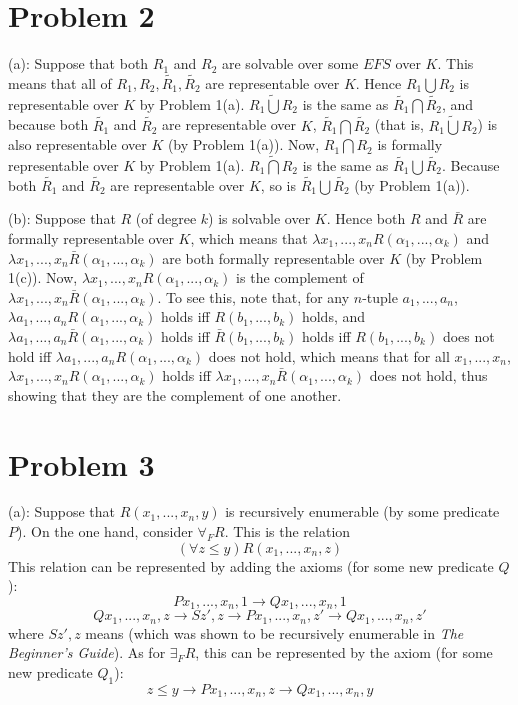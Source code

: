 \documentclass{article}
\theoremstyle{definition}
\begin{document}
\section*{Problem 2}
(a): Suppose that both $R_1$ and $R_2$ are solvable over some $EFS$ over $K$. This means that all of $R_1,R_2,\widetilde{R_1},\widetilde{R_2}$ are 
representable over $K$. Hence $R_1\bigcup R_2$ is representable over $K$ by Problem 1(a). 
$\widetilde{R_1\bigcup R_2}$ is the same as $\widetilde{R_1}\bigcap\widetilde{R_2}$, and because both $\widetilde{R_1}$ and $\widetilde{R_2}$ are 
representable over $K$, $\widetilde{R_1}\bigcap\widetilde{R_2}$ (that is, $\widetilde{{R_1}\bigcup{R_2}}$) is also representable over $K$ (by Problem 1(a)). 
Now, $R_1\bigcap R_2$ is formally representable over $K$ by Problem 1(a). $\widetilde{R_1\bigcap R_2}$ is the same as 
$\widetilde{R_1}\bigcup\widetilde{R_2}$. Because both $\widetilde{R_1}$ and $\widetilde{R_2}$ are representable over $K$, so is 
$\widetilde{R_1}\bigcup\widetilde{R_2}$ (by Problem 1(a)).


(b): Suppose that $R$ (of degree $k$) is solvable over $K$. Hence both $R$ and $\bar{R}$ are formally representable over $K$, which means that
$\lambda x_1,...,x_nR\left(\alpha_1,...,\alpha_k\right)$ and $\lambda x_1,...,x_n\bar{R}\left(\alpha_1,...,\alpha_k\right)$ are both 
formally representable over $K$ (by Problem 1(c)). Now, $\lambda x_1,...,x_nR\left(\alpha_1,...,\alpha_k\right)$ is the complement of 
$\lambda x_1,...,x_n\bar{R}\left(\alpha_1,...,\alpha_k\right)$. To see this, note that, for any $n$-tuple $a_1,...,a_n$, 
$\lambda a_1,...,a_nR\left(\alpha_1,...,\alpha_k\right)$ holds iff $R\left(b_1,...,b_k\right)$ holds, and 
$\lambda a_1,...,a_n\bar{R}\left(\alpha_1,...,\alpha_k\right)$ holds iff $\bar{R}\left(b_1,...,b_k\right)$ holds iff 
$R\left(b_1,...,b_k\right)$ does not hold iff $\lambda a_1,...,a_nR\left(\alpha_1,...,\alpha_k\right)$ does not hold, which means that for all 
$x_1,...,x_n$, $\lambda x_1,...,x_nR\left(\alpha_1,...,\alpha_k\right)$ holds iff $\lambda x_1,...,x_n\bar{R}\left(\alpha_1,...,\alpha_k\right)$ does not 
hold, thus showing that they are the complement of one another. 

\section*{Problem 3}
(a): Suppose that $R\left(x_1,...,x_n,y\right)$ is recursively enumerable (by some predicate $P$). On the one hand, consider $\forall_F R$. This is the 
relation \[ \left(\forall z\le y\right)R\left(x_1,...,x_n,z\right) \] This relation can be represented by adding the axioms (for some new predicate $Q$):
\[ Px_1,...,x_n,1\rightarrow Qx_1,...,x_n,1 \] \[ Qx_1,...,x_n,z\rightarrow Sz',z\rightarrow Px_1,...,x_n,z'\rightarrow Qx_1,...,x_n,z' \]
where $Sz',z$ means  (which was shown to be recursively enumerable in \textit{The Beginner's Guide}).
As for $\exists_F R$, this can be represented by the axiom (for some new predicate $Q_1$):
\[ z\le y\rightarrow Px_1,...,x_n,z\rightarrow Qx_1,...,x_n,y \]
\end{document}
